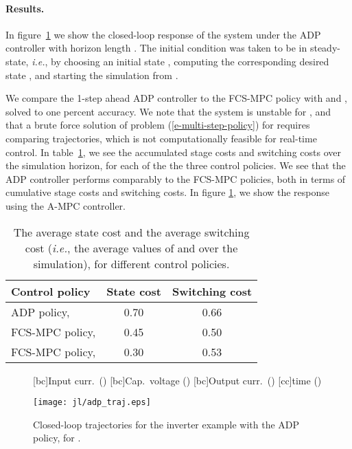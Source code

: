 \documentclass[12pt]{article}
\newcommand{\ie}{{\it i.e.}}
\newif\ifarxiv
\begin{document}
\paragraph{Results.}
In figure~\ref{f-inverter-traj-adp}
we show the closed-loop response of the system
under the ADP controller with horizon length .
The initial condition was taken to be in steady-state,
\ie, by choosing an initial state ,
computing the corresponding desired state 
,
and starting the simulation from .

We compare the 1-step ahead ADP controller
to the FCS-MPC policy with  and ,
solved to one percent accuracy.
We note that the system is unstable for ,
and that a brute force solution of problem (\ref{e-multi-step-policy}) for 
requires comparing  trajectories, 
which is not computationally feasible for real-time control.
In table~\ref{t-inverter}, 
we see the accumulated stage costs and switching costs over the simulation horizon,
for each of the the three control policies.
We see that the ADP controller performs comparably to the FCS-MPC policies,
both in terms of cumulative stage costs and switching costs.
In figure 
\ref{f-inverter-traj-adp},
we show the response using the A-MPC controller.

\begin{table}
\begin{center}
\begin{tabular}{lcc}
{\bf Control policy}             & {\bf State cost}   & {\bf Switching cost}   \\
\hline \hline                                                                 
ADP policy,            & 0.70               & 0.66        \\
FCS-MPC policy,           & 0.45               & 0.50        \\
FCS-MPC policy,          & 0.30               & 0.53        \\
\hline
\end{tabular}
\end{center}
\caption{
The average state cost and the average switching cost 
(\ie, the average values of  and 
over the simulation),
for different control policies.
}
\label{t-inverter}
\end{table}






\begin{figure}
\centering
{}[bc]{Input curr.\ ()}
[bc]{Cap.\ voltage ()}
[bc]{Output curr.\ ()}
[cc]{time ()}
\ifarxiv
\texttt{[image: adp\_traj.eps]}
\else
\texttt{[image: jl/adp\_traj.eps]}
\fi
\caption{
Closed-loop trajectories for the inverter example with the ADP policy,
for .
}
\label{f-inverter-traj-adp}
\end{figure}
\end{document}
